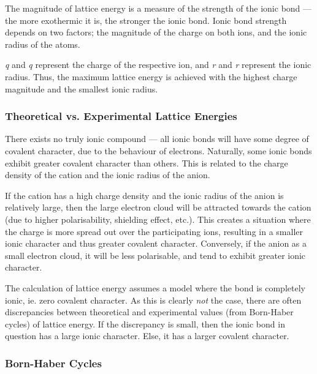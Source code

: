 		The magnitude of lattice energy is a measure of the strength of the ionic bond — the more exothermic it is, the stronger the ionic bond.
		Ionic bond strength depends on two factors; the magnitude of the charge on both ions, and the ionic radius of the atoms.


		\emph{q\sbs{+}} and \emph{q\sbs{-}} represent the charge of the respective ion, and \emph{r\sbs{+}} and \emph{r\sbs{-}} represent
		the ionic radius. Thus, the maximum lattice energy is achieved with the highest charge magnitude and the smallest ionic radius.


		\subsubsection{Theoretical vs. Experimental Lattice Energies}

			There exists no truly ionic compound –– all ionic bonds will have some degree of covalent character, due to the behaviour of
			electrons. Naturally, some ionic bonds exhibit greater covalent character than others. This is related to the charge density
			of the cation and the ionic radius of the anion.

			If the cation has a high charge density and the ionic radius of the anion is relatively large, then the large electron cloud
			will be attracted towards the cation (due to higher polarisability, shielding effect, etc.). This creates a situation where the
			charge is more spread out over the participating ions, resulting in a smaller ionic character and thus greater covalent
			character. Conversely, if the anion as a small electron cloud, it will be less polarisable, and tend to exhibit greater ionic
			character.

			The calculation of lattice energy assumes a model where the bond is completely ionic, ie. zero covalent character. As this is
			clearly \textit{not} the case, there are often discrepancies between theoretical and experimental values (from Born-Haber cycles)
			of lattice energy. If the discrepancy is small, then the ionic bond in question has a large ionic character. Else, it has a
			larger covalent character.


		\subsubsection{Born-Haber Cycles}

